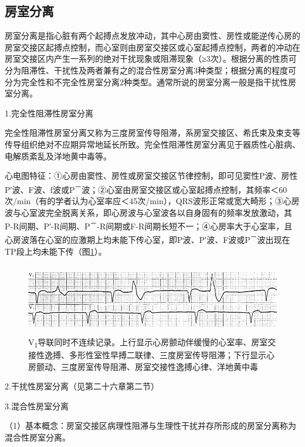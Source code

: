 \protect\hypertarget{text00037.htmlux5cux23subid433}{}{}

\subsection{房室分离}

房室分离是指心脏有两个起搏点发放冲动，其中心房由窦性、房性或能逆传心房的房室交接区起搏点控制，而心室则由房室交接区或心室起搏点控制，两者的冲动在房室交接区内产生一系列的绝对干扰现象或阻滞现象（≥3次）。根据分离的性质可分为阻滞性、干扰性及两者兼有之的混合性房室分离3种类型；根据分离的程度可分为完全性和不完全性房室分离2种类型。通常所说的房室分离一般是指干扰性房室分离。

1.完全性阻滞性房室分离

完全性阻滞性房室分离又称为三度房室传导阻滞，系房室交接区、希氏束及束支等传导组织绝对不应期异常地延长所致。完全性阻滞性房室分离见于器质性心脏病、电解质紊乱及洋地黄中毒等。

心电图特征：①心房由窦性、房性或房室交接区节律控制，即可见窦性P波、房性P′波、F波、f波或P\textsuperscript{－}波；②心室由房室交接区或心室起搏点控制，其频率＜60次/min（有的学者认为心室率应＜45次/min），QRS波形正常或宽大畸形；③心房波与心室波完全脱离关系，即心房波与心室波各以自身固有的频率发放激动，其P-R间期、P′-R间期、P\textsuperscript{－}-R间期或F-R间期长短不一；④心房率大于心室率，且心房波落在心室的应激期上均未能下传心室，即P波、P′波、F波或P\textsuperscript{－}波出现在TP段上均未能下传（图\ref{fig30-3}）。

\begin{figure}[!htbp]
 \centering
 \includegraphics[width=5.58333in,height=1.20833in]{./images/Image00498.jpg}
 \captionsetup{justification=centering}
 \caption{V\textsubscript{1}导联同时不连续记录。上行显示心房颤动伴缓慢的心室率、房室交接性逸搏、多形性室性早搏二联律、三度房室传导阻滞；下行显示心房颤动、三度房室传导阻滞、房室交接性逸搏心律、洋地黄中毒}
 \label{fig30-3}
  \end{figure} 


2.干扰性房室分离（见第二十六章第二节）

3.混合性房室分离

（1）基本概念：房室交接区病理性阻滞与生理性干扰并存所形成的房室分离称为混合性房室分离。

